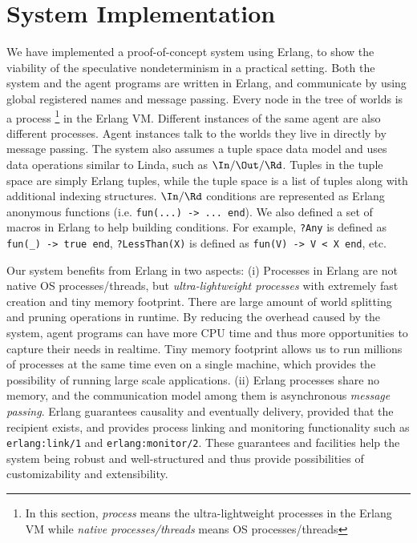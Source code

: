 \section{System Implementation}\label{sec:impl}

We have implemented a proof-of-concept system using Erlang,
to show the viability of 
the speculative nondeterminism in a practical setting. 
Both the system and the agent programs are written in Erlang, 
and communicate by using global registered names and message passing. 
Every node in the tree of worlds is a process
\footnote{In this section, {\em process} 
means the ultra-lightweight processes in the Erlang VM
while {\em native processes/threads} means OS processes/threads} 
in the Erlang VM. 
Different instances of the same agent are also different processes. 
Agent instances talk to the worlds they live in directly by message passing. 
The system also assumes a tuple space data model and uses data
operations similar to Linda, such as $\In/\Out/\Rd$.
Tuples in the tuple space are simply Erlang tuples, 
while the tuple space is a list of tuples along with additional indexing structures. 
$\In/\Rd$ conditions are represented as Erlang anonymous functions
(i.e. {\tt fun(...) -> ... end}). 
We also defined a set of macros in Erlang to help building conditions. 
For example, {\tt ?Any} is defined as {\tt fun(\_) -> true end}, 
{\tt ?LessThan(X)} is defined as {\tt fun(V) -> V < X end}, etc.

Our system benefits from Erlang in two aspects:
    (i) Processes in Erlang are not native OS processes/threads, 
        but {\em ultra-lightweight processes}
        with extremely fast creation and tiny memory footprint. 
        There are large amount of world splitting and pruning operations in runtime.
        By reducing the overhead caused by the system, agent programs can have 
        more CPU time and thus more opportunities to capture their needs in realtime. 
        Tiny memory footprint allows us to run millions of processes at the same time 
        even on a single machine, which provides the possibility of running large scale applications. 
    (ii) Erlang processes share no memory, and the communication model among them is asynchronous 
        {\em message passing}. Erlang guarantees causality and eventually delivery,
        provided that the recipient exists, and provides process linking and monitoring functionality
        such as {\tt erlang:link/1} and {\tt erlang:monitor/2}. 
        These guarantees and facilities help the system being robust and well-structured and thus
        provide possibilities of customizability and extensibility. 

